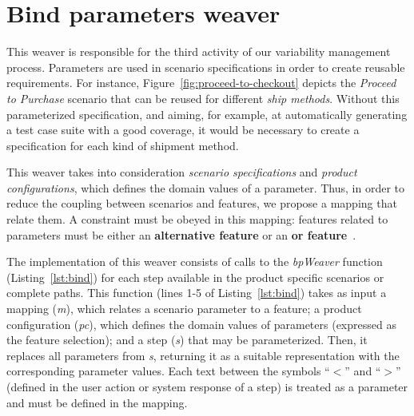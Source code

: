 \documentclass[11pt]{report}
\begin{document}



\section{Bind parameters weaver}\label{sub:bind-weaver}

This weaver is responsible for the third activity of our variability
management process. Parameters are used in scenario specifications 
in order to create reusable requirements. 
For instance, Figure~\ref{fig:proceed-to-checkout} depicts the \emph{Proceed to Purchase} 
scenario that can be reused for different \emph{ship methods}. Without this
parameterized specification, and aiming, for example, at automatically generating a test case suite 
with a good coverage, it would be necessary to create a specification for each kind of shipment method.

This weaver takes into consideration \emph{scenario specifications} and 
\emph{product configurations}, which defines the domain values of a
parameter. Thus, in order to reduce the coupling between scenarios and features, 
we propose a mapping that relate them. A constraint must be obeyed in this mapping: features related to parameters must be either an {\bf alternative feature} or an {\bf or feature}~\cite{gheyi-alloy-06,czarnecki-wsfactory-2005,czarnecki-book}.

The implementation of this weaver consists of calls to 
the \mbox{\emph{bpWeaver}} function (Listing~\ref{lst:bind}) for each step 
available in the product specific scenarios or complete paths. This
function (lines 1-5 of Listing~\ref{lst:bind}) takes as
input a mapping (\emph{m}), which relates a scenario parameter to a 
feature; a product configuration (\emph{pc}), which defines 
the domain values of parameters (expressed as the feature selection); and a step (\emph{s}) that may be parameterized. Then, it replaces all parameters
from \emph{s}, returning it as a suitable representation with the
corresponding parameter values. Each text between the symbols ``$<$'' and ``$>$''
(defined in the user action or system response of a
step) is treated as a parameter and must be defined in the
mapping.
\end{document}
